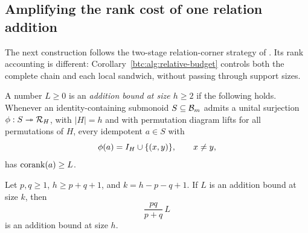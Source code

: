 \subsection{Amplifying the rank cost of one relation addition}
\label{btc:alg:amplification-section}

The next construction follows the two-stage relation-corner strategy
of \cite{OpenAILiveness2026}. Its rank accounting is different:
Corollary~\ref{btc:alg:relative-budget} controls both the complete chain
and each local sandwich, without passing through support sizes.

\begin{definition}\label{btc:alg:admissible-bound}
A number $L\ge0$ is an \emph{addition bound at size $h\ge2$} if the
following holds. Whenever an identity-containing submonoid
$S\subseteq\mathcal{B}_{m}$ admits a unital surjection
$\phi:S\twoheadrightarrow\mathcal{R}_{H}$, with $|H|=h$ and with permutation
diagram lifts for all permutations of $H$, every idempotent $a\in S$
with
\[
 \phi(a)=I_H\cup\{(x,y)\},\qquad x\ne y,
\]
has $\operatorname{corank}(a)\ge L$.
\end{definition}

\begin{proposition}\label{btc:alg:amplification}
Let $p,q\ge1$, $h\ge p+q+1$, and $k=h-p-q+1$. If $L$ is an
addition bound at size $k$, then
\begin{equation}\label{btc:alg:general-amplification}
 \frac{pq}{p+q}\,L
\end{equation}
is an addition bound at size $h$.
\end{proposition}

